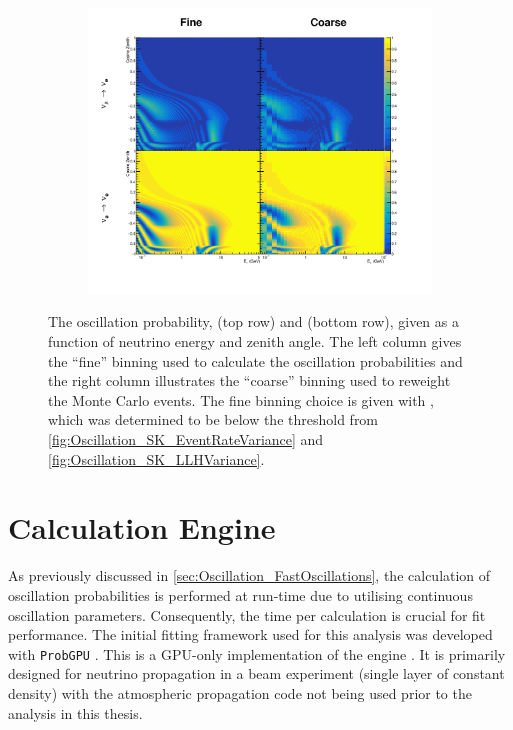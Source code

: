 \begin{figure}[h]
  \begin{subfigure}[t]{\textwidth}
    \includegraphics[width=\textwidth, trim={0mm 0mm 0mm 0mm}, clip,page=1]{Figures/Oscillation/SmearingImplementation.pdf}
  \end{subfigure}
  \caption{The oscillation probability,  (top row) and  (bottom row), given as a function of neutrino energy and zenith angle. The left column gives the ``fine'' binning used to calculate the oscillation probabilities and the right column illustrates the ``coarse'' binning used to reweight the Monte Carlo events. The fine binning choice is given with , which was determined to be below the threshold from \autoref{fig:Oscillation_SK_EventRateVariance} and \autoref{fig:Oscillation_SK_LLHVariance}.}
  \label{fig:Oscillation_SK_SmearingImplementation}
\end{figure}

\section{Calculation Engine}
\label{sec:Oscillation_CalculationEngine}

As previously discussed in \autoref{sec:Oscillation_FastOscillations}, the calculation of oscillation probabilities is performed at run-time due to utilising continuous oscillation parameters. Consequently, the time per calculation is crucial for fit performance. The initial fitting framework used for this analysis was developed with \texttt{ProbGPU} \cite{probgpu}. This is a GPU-only implementation of the  engine \cite{Prob3}. It is primarily designed for neutrino propagation in a beam experiment (single layer of constant density) with the atmospheric propagation code not being used prior to the analysis in this thesis.

